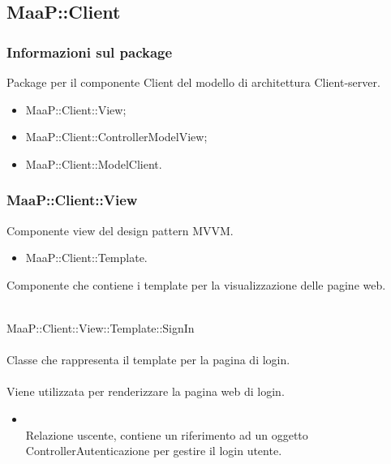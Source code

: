 \subsection{MaaP::Client}
\subsubsection{Informazioni sul package}
Package per il componente Client del modello di architettura Client-server.
\begin{itemize}
\item MaaP::Client::View;
\item MaaP::Client::ControllerModelView;
\item MaaP::Client::ModelClient.
\end{itemize}

\subsubsection{MaaP::Client::View}
Componente view del design pattern MVVM.
\begin{itemize}
\item MaaP::Client::Template.
\end{itemize}

Componente che contiene i template per la visualizzazione delle pagine web.

\\
MaaP::Client::View::Template::SignIn\\
\\
Classe che rappresenta il template per la pagina di login.\\
\\
Viene utilizzata per renderizzare la pagina web di login.\\
\begin{itemize}
\item{}\\
Relazione uscente, contiene un riferimento ad un oggetto ControllerAutenticazione per gestire il login utente.
\end{itemize}

